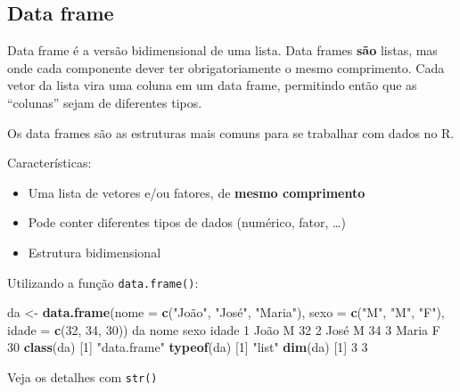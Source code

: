 \documentclass[10pt,a4paper]{book}
\newenvironment{Shaded}{\begin{snugshade}}{\end{snugshade}}
\newcommand{\KeywordTok}[1]{\textcolor[rgb]{0.13,0.29,0.53}{\textbf{#1}}}
\newcommand{\DataTypeTok}[1]{\textcolor[rgb]{0.13,0.29,0.53}{#1}}
\newcommand{\DecValTok}[1]{\textcolor[rgb]{0.00,0.00,0.81}{#1}}
\newcommand{\StringTok}[1]{\textcolor[rgb]{0.31,0.60,0.02}{#1}}
\newcommand{\NormalTok}[1]{#1}
\providecommand{\tightlist}{%
  \setlength{\itemsep}{0pt}\setlength{\parskip}{0pt}}
\begin{document}
\subsection{Data frame}\label{data-frame}

Data frame é a versão bidimensional de uma lista. Data frames
\textbf{são} listas, mas onde cada componente dever ter obrigatoriamente
o mesmo comprimento. Cada vetor da lista vira uma coluna em um data
frame, permitindo então que as ``colunas'' sejam de diferentes tipos.

Os data frames são as estruturas mais comuns para se trabalhar com dados
no R.

Características:

\begin{itemize}
\tightlist
\item
  Uma lista de vetores e/ou fatores, de \textbf{mesmo comprimento}
\item
  Pode conter diferentes tipos de dados (numérico, fator, \ldots{})
\item
  Estrutura bidimensional
\end{itemize}

Utilizando a função \texttt{data.frame()}:

\begin{Shaded}
\begin{Highlighting}[]
\NormalTok{da <-}\StringTok{ }\KeywordTok{data.frame}\NormalTok{(}\DataTypeTok{nome =} \KeywordTok{c}\NormalTok{(}\StringTok{"João"}\NormalTok{, }\StringTok{"José"}\NormalTok{, }\StringTok{"Maria"}\NormalTok{),}
                 \DataTypeTok{sexo =} \KeywordTok{c}\NormalTok{(}\StringTok{"M"}\NormalTok{, }\StringTok{"M"}\NormalTok{, }\StringTok{"F"}\NormalTok{),}
                 \DataTypeTok{idade =} \KeywordTok{c}\NormalTok{(}\DecValTok{32}\NormalTok{, }\DecValTok{34}\NormalTok{, }\DecValTok{30}\NormalTok{))}
\NormalTok{da}
\NormalTok{   nome sexo idade}
\DecValTok{1}\NormalTok{  João    M    }\DecValTok{32}
\DecValTok{2}\NormalTok{  José    M    }\DecValTok{34}
\DecValTok{3}\NormalTok{ Maria    F    }\DecValTok{30}
\KeywordTok{class}\NormalTok{(da)}
\NormalTok{[}\DecValTok{1}\NormalTok{] }\StringTok{"data.frame"}
\KeywordTok{typeof}\NormalTok{(da)}
\NormalTok{[}\DecValTok{1}\NormalTok{] }\StringTok{"list"}
\KeywordTok{dim}\NormalTok{(da)}
\NormalTok{[}\DecValTok{1}\NormalTok{] }\DecValTok{3} \DecValTok{3}
\end{Highlighting}
\end{Shaded}

Veja os detalhes com \texttt{str()}
\end{document}
